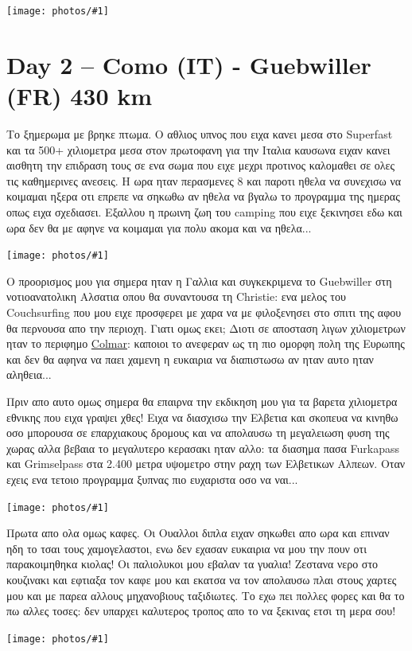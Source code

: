 \documentclass[11pt, letterpaper]{book}
\newcommand\photo[1]{\noindent\texttt{[image: photos/\#1]}}
\begin{document}
\photo{18.jpg}

\chapter{Day 2 -- Como (IT) - Guebwiller (FR) 430 km}

Το ξημερωμα με βρηκε πτωμα. Ο αθλιος υπνος που ειχα κανει μεσα στο Superfast και τα 500+ χιλιομετρα μεσα στον πρωτοφανη για την Ιταλια καυσωνα ειχαν κανει αισθητη την επιδραση τους σε ενα σωμα που ειχε μεχρι προτινος καλομαθει σε ολες τις καθημερινες ανεσεις. Η ωρα ηταν περασμενες 8 και παροτι ηθελα να συνεχισω να κοιμαμαι ηξερα οτι επρεπε να σηκωθω αν ηθελα να βγαλω το προγραμμα της ημερας οπως ειχα σχεδιασει. Εξαλλου η πρωινη ζωη του camping που ειχε ξεκινησει εδω και ωρα δεν θα με αφηνε να κοιμαμαι για πολυ ακομα και να ηθελα...

\photo{19.jpg}

Ο προορισμος μου για σημερα ηταν η Γαλλια και συγκεκριμενα το Guebwiller στη νοτιοανατολικη Αλσατια οπου θα συναντουσα τη Christie: ενα μελος του Couchsurfing που μου ειχε προσφερει με χαρα να με φιλοξενησει στο σπιτι της αφου θα περνουσα απο την περιοχη. Γιατι ομως εκει; Διοτι σε αποσταση λιγων χιλιομετρων ηταν το περιφημο \href{http://en.wikipedia.org/wiki/Colmar}{Colmar}: καποιοι το ανεφεραν ως τη πιο ομορφη πολη της Ευρωπης και δεν θα αφηνα να παει χαμενη η ευκαιρια να διαπιστωσω αν ηταν αυτο ηταν αληθεια...

Πριν απο αυτο ομως σημερα θα επαιρνα την εκδικηση μου για τα βαρετα χιλιομετρα εθνικης που ειχα γραψει χθες! Ειχα να διασχισω την Ελβετια και σκοπευα να κινηθω οσο μπορουσα σε επαρχιακους δρομους και να απολαυσω τη μεγαλειωση φυση της χωρας αλλα βεβαια το μεγαλυτερο κερασακι ηταν αλλο: τα διασημα πασα Furkapass και Grimselpass στα 2.400 μετρα υψομετρο στην ραχη των Ελβετικων Αλπεων.
Οταν εχεις ενα τετοιο προγραμμα ξυπνας πιο ευχαριστα οσο να ναι...

\photo{20.jpg}

Πρωτα απο ολα ομως καφες. Οι Ουαλλοι διπλα ειχαν σηκωθει απο ωρα και επιναν ηδη το τσαι τους χαμογελαστοι, ενω δεν εχασαν ευκαιρια να μου την πουν οτι παρακοιμηθηκα κιολας! Οι παλιολυκοι μου εβαλαν τα γυαλια!
Ζεστανα νερο στο κουζινακι και εφτιαξα τον καφε μου και εκατσα να τον απολαυσω πλαι στους χαρτες μου και με παρεα αλλους μηχανοβιους ταξιδιωτες.
Το εχω πει πολλες φορες και θα το πω αλλες τοσες: δεν υπαρχει καλυτερος τροπος απο το να ξεκινας ετσι τη μερα σου!

\photo{21.jpg}
\end{document}
